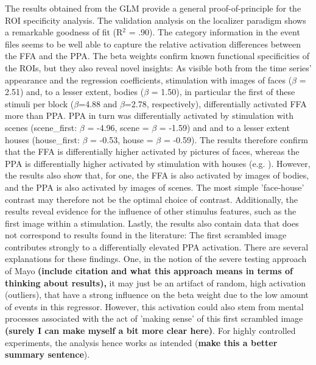 \documentclass[a4paper, 12pt]{scrreprt}
\begin{document}
The results obtained from the GLM provide a general proof-of-principle for the ROI specificity analysis. The validation analysis on the localizer paradigm shows a remarkable goodness of fit (R$^2$ = .90). The category information in the event files seems to be well able to capture the relative activation differences between the FFA and the PPA. The beta weights confirm known functional specificities of the ROIs, but they also reveal novel insights: As visible both from the time series' appearance and the regression coefficients, stimulation with images of faces ($\beta$ = 2.51) and, to a lesser extent, bodies ($\beta$ = 1.50), in particular the first of these stimuli per block ($\beta$=4.88 and $\beta$=2.78, respectively), differentially activated FFA more than PPA. PPA in turn was differentially activated by stimulation with scenes (scene\_first: $\beta$ = -4.96, scene = $\beta$ = -1.59) and and to a lesser extent houses (house\_first: $\beta$ = -0.53, house = $\beta$ = -0.59). The results therefore confirm that the FFA is differentially higher activated by pictures of faces, whereas the PPA is differentially higher activated by stimulation with houses (e.g. \cite{fox2009defining}). However, the results also show that, for one, the FFA is also activated by images of bodies, and the PPA is also activated by images of scenes. The most simple 'face-house' contrast may therefore not be the optimal choice of contrast. Additionally, the results reveal evidence for the influence of other stimulus features, such as the first image within a stimulation. Lastly, the results also contain data that does not correspond to results found in the literature: The first scrambled image contributes strongly to a differentially elevated PPA activation. There are several explanations for these findings. One, in the notion of the severe testing approach of Mayo\textbf{ (include citation and what this approach means in terms of thinking about results), }it may just be an artifact of random, high activation (outliers), that have a strong influence on the beta weight due to the low amount of events in this regressor. However, this activation could also stem from mental processes associated with the act of 'making sense' of this first scrambled image \textbf{(surely I can make myself a bit more clear here)}. For highly controlled experiments, the analysis hence works as intended (\textbf{make this a better summary sentence}).
\newline
\end{document}
